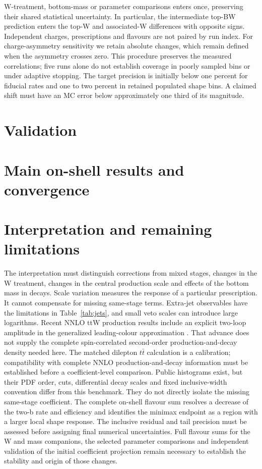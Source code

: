 \documentclass[11pt,a4paper]{article}
\begin{document}
W-treatment, bottom-mass or parameter comparisons enters once, preserving
their shared statistical uncertainty. In particular, the intermediate
top-BW prediction enters the top-W and associated-W differences with
opposite signs. Independent charges, prescriptions and flavours are not paired
by run index. For charge-asymmetry sensitivity we retain absolute changes,
which remain defined when the asymmetry crosses zero. This procedure
preserves the measured correlations; five runs alone do not establish
coverage in poorly sampled bins or under adaptive stopping.
The target precision is initially below one percent for fiducial rates
and one to two percent in retained populated shape bins. A claimed shift
must have an MC error below approximately one third of its magnitude.

\section{Validation}


\section{Main on-shell results and convergence}


\section{Interpretation and remaining limitations}

The interpretation must distinguish corrections from mixed stages, changes
in the W treatment, changes in the central production scale and effects of
the bottom mass in decays. Scale variation measures the response
of a particular prescription. It cannot compensate for missing
same-stage terms. Extra-jet observables have the limitations in
Table~\ref{tab:jets}, and small veto scales can introduce large logarithms.
Recent NNLO ttW production results include an explicit two-loop amplitude
in the generalized leading-colour approximation \cite{Becchetti2026}.
That advance does not supply the complete spin-correlated second-order
production-and-decay density needed here.
The matched dilepton $t\bar t$ calculation is a calibration; compatibility
with complete NNLO production-and-decay information \cite{Czakon2020}
must be established before a coefficient-level comparison.
Public histograms exist, but their PDF order, cuts, differential decay scales
and fixed inclusive-width convention differ from this benchmark. They do not
directly isolate the missing same-stage coefficient.
The complete on-shell flavour sum resolves a decrease of the two-b rate
and efficiency and identifies the minimax endpoint as a region with a
larger local shape response. The inclusive residual and tail precision
must be assessed before assigning final numerical uncertainties. Full
flavour sums for the W and mass companions, the selected parameter
comparisons and independent validation of the initial coefficient projection remain necessary to
establish the stability and origin of those changes.
\end{document}
